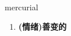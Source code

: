 
\begin{frame}
{\huge mercurial}
\begin{center}
\begin{enumerate}\Large
  \item \textbf{(情绪)善变的}
\end{enumerate}
\end{center}
\end{frame}
